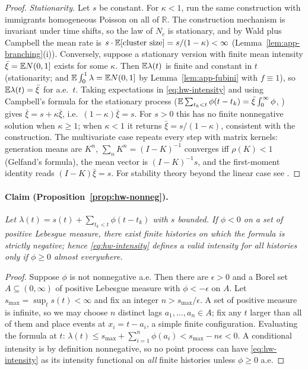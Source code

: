 \begin{proof}
\emph{Stationarity.} Let $s$ be constant. For $\kappa < 1$, run the same construction with
immigrants homogeneous Poisson on all of $\mathbb{R}$. The construction mechanism is invariant under
time shifts, so the law of $N_c$ is stationary, and by Wald plus Campbell the mean rate is $s \cdot
\mathbb{E}[\text{cluster size}] = s/(1-\kappa) < \infty$ (Lemma~\ref{lem:app-branching}(i)). Conversely,
suppose a stationary version with finite mean intensity $\bar\xi = \mathbb{E} N(0,1]$ exists for some
$\kappa$. Then $\mathbb{E} \lambda(t)$ is finite and constant in $t$ (stationarity; and $\mathbb{E} \int_0^1 \lambda
= \mathbb{E} N(0,1]$ by Lemma~\ref{lem:app-fubini} with $f \equiv 1$), so $\mathbb{E}\lambda(t) = \bar\xi$ for a.e.\
$t$. Taking expectations in \eqref{eq:hw-intensity} and using Campbell's formula for the stationary
process ($\mathbb{E} \sum_{t_k < t} \phi(t - t_k) = \bar\xi \int_0^\infty \phi$, \cite{daley2003}) gives
$\bar\xi = s + \kappa \bar\xi$, i.e.\ $(1-\kappa)\bar\xi = s$. For $s > 0$ this has no finite
nonnegative solution when $\kappa \ge 1$; when $\kappa < 1$ it returns $\bar\xi = s/(1-\kappa)$,
consistent with the construction. The multivariate case repeats every step with matrix kernels:
generation means are $K^n$, $\sum_n K^n = (I - K)^{-1}$ converges iff $\rho(K) < 1$ (Gelfand's
formula), the mean vector is $(I-K)^{-1}s$, and the first-moment identity reads $(I - K)\bar\xi =
s$. For stability theory beyond the linear case see \cite{bremaud1996}.
\end{proof}

\paragraph{Claim (Proposition~\ref{prop:hw-nonneg}).}
\emph{Let $\lambda(t) = s(t) + \sum_{t_k < t} \phi(t - t_k)$ with $s$ bounded. If $\phi < 0$ on a
set of positive Lebesgue measure, there exist finite histories on which the formula is strictly
negative; hence \eqref{eq:hw-intensity} defines a valid intensity for all histories only if $\phi
\ge 0$ almost everywhere.}

\begin{proof}
Suppose $\phi$ is not nonnegative a.e. Then there are $\epsilon > 0$ and a Borel set $A \subseteq
(0, \infty)$ of positive Lebesgue measure with $\phi < -\epsilon$ on $A$. Let $s_{\max} = \sup_t
s(t) < \infty$ and fix an integer $n > s_{\max}/\epsilon$. A set of positive measure is infinite, so
we may choose $n$ distinct lags $a_1, \dots, a_n \in A$; fix any $t$ larger than all of them and
place events at $x_i = t - a_i$, a simple finite configuration. Evaluating the formula at $t$:
$\lambda(t) \le s_{\max} + \sum_{i=1}^n \phi(a_i) < s_{\max} - n\epsilon < 0$. A conditional
intensity is by definition nonnegative, so no point process can have \eqref{eq:hw-intensity} as its
intensity functional on \emph{all} finite histories unless $\phi \ge 0$ a.e.
\end{proof}

